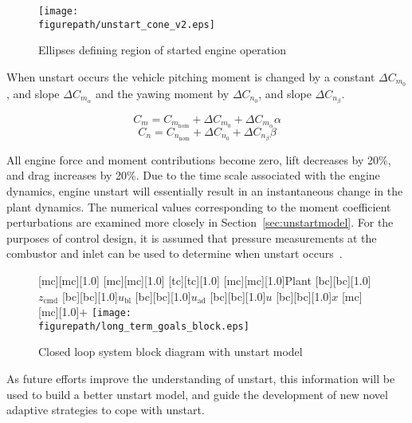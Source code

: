 \begin{figure}[H]
  \begin{center}
    \texttt{[image: \\figurepath/unstart\_cone\_v2.eps]}
    \caption{Ellipses defining region of started engine operation\label{fig:unstartcone}}
  \end{center}
\end{figure}

When unstart occurs the vehicle pitching moment is changed by a constant $\Delta C_{m_{0}}$, and slope $\Delta C_{m_{\alpha}}$ and the yawing moment by $\Delta C_{n_{0}}$, and slope $\Delta C_{n_{\beta}}$.

\begin{equation}
  C_{m}=C_{m_{\text{nom}}}+\Delta C_{m_{0}}+\Delta C_{m_{\alpha}}\alpha
\end{equation}
\begin{equation}
  C_{n}=C_{n_{\text{nom}}}+\Delta C_{n_{0}}+\Delta C_{n_{\beta}}\beta
\end{equation}

All engine force and moment contributions become zero, lift decreases by 20\%, and drag increases by 20\%.
Due to the time scale associated with the engine dynamics, engine unstart will essentially result in an instantaneous change in the plant dynamics.
The numerical values corresponding to the moment coefficient perturbations are examined more closely in Section~\ref{sec:unstartmodel}.
For the purposes of control design, it is assumed that pressure measurements at the combustor and inlet can be used to determine when unstart occurs\ \cite{wang.risk.2012}.

\begin{figure}[H]
  \fontsize{10pt}{10pt}\selectfont
  \begin{center}
    [mc][mc][1.0]{}
    [mc][mc][1.0]{}
    [tc][tc][1.0]{\fontsize{10pt}{10pt}\selectfont\bf{}}
    [mc][mc][1.0]{Plant}
    [bc][bc][1.0]{$z_{\text{cmd}}$}
    [bc][bc][1.0]{$u_{\text{bl}}$}
    [bc][bc][1.0]{$u_{\text{ad}}$}
    [bc][bc][1.0]{$u$}
    [bc][bc][1.0]{$x$}
    [mc][mc][1.0]{$+$}
    \texttt{[image: \\figurepath/long\_term\_goals\_block.eps]}
    \caption{Closed loop system block diagram with unstart model}
  \end{center}
\end{figure}

As future efforts improve the understanding of unstart, this information will be used to build a better unstart model, and guide the development of new novel adaptive strategies to cope with unstart.
